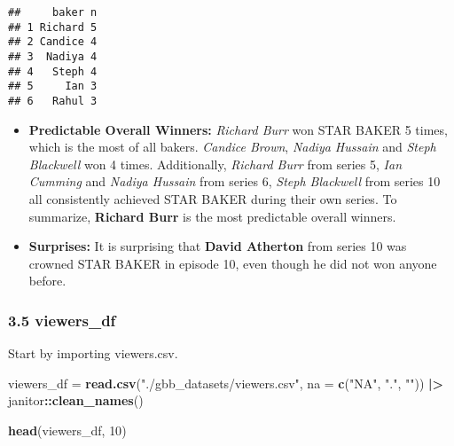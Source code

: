 \documentclass[
]{article}
\newenvironment{Shaded}{\begin{snugshade}}{\end{snugshade}}
\newcommand{\AttributeTok}[1]{\textcolor[rgb]{0.13,0.29,0.53}{#1}}
\newcommand{\DecValTok}[1]{\textcolor[rgb]{0.00,0.00,0.81}{#1}}
\newcommand{\FunctionTok}[1]{\textcolor[rgb]{0.13,0.29,0.53}{\textbf{#1}}}
\newcommand{\NormalTok}[1]{#1}
\newcommand{\OtherTok}[1]{\textcolor[rgb]{0.56,0.35,0.01}{#1}}
\newcommand{\SpecialCharTok}[1]{\textcolor[rgb]{0.81,0.36,0.00}{\textbf{#1}}}
\newcommand{\StringTok}[1]{\textcolor[rgb]{0.31,0.60,0.02}{#1}}
\begin{document}
\begin{verbatim}
##     baker n
## 1 Richard 5
## 2 Candice 4
## 3  Nadiya 4
## 4   Steph 4
## 5     Ian 3
## 6   Rahul 3
\end{verbatim}

\begin{itemize}
\item
  \textbf{Predictable Overall Winners:} \emph{Richard Burr} won STAR
  BAKER 5 times, which is the most of all bakers. \emph{Candice Brown},
  \emph{Nadiya Hussain} and \emph{Steph Blackwell} won 4 times.
  Additionally, \emph{Richard Burr} from series 5, \emph{Ian Cumming}
  and \emph{Nadiya Hussain} from series 6, \emph{Steph Blackwell} from
  series 10 all consistently achieved STAR BAKER during their own
  series. To summarize, \textbf{Richard Burr} is the most predictable
  overall winners.
\item
  \textbf{Surprises:} It is surprising that \textbf{David Atherton} from
  series 10 was crowned STAR BAKER in episode 10, even though he did not
  won anyone before.
\end{itemize}

\subsubsection{3.5 viewers\_df}\label{viewers_df}

Start by importing viewers.csv.

\begin{Shaded}
\begin{Highlighting}[]
\NormalTok{viewers\_df }\OtherTok{=} \FunctionTok{read.csv}\NormalTok{(}\StringTok{"./gbb\_datasets/viewers.csv"}\NormalTok{, }
                      \AttributeTok{na =} \FunctionTok{c}\NormalTok{(}\StringTok{"NA"}\NormalTok{, }\StringTok{"."}\NormalTok{, }\StringTok{""}\NormalTok{)) }\SpecialCharTok{|\textgreater{}}
\NormalTok{  janitor}\SpecialCharTok{::}\FunctionTok{clean\_names}\NormalTok{() }

\FunctionTok{head}\NormalTok{(viewers\_df, }\DecValTok{10}\NormalTok{)}
\end{Highlighting}
\end{Shaded}
\end{document}
